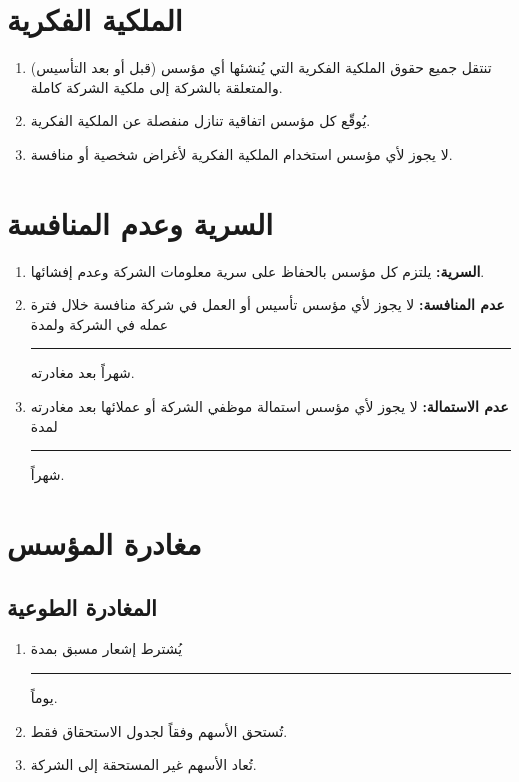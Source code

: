 \documentclass[12pt,a4paper]{article}
\begin{document}
\section{الملكية الفكرية}
\label{sec:ip}

\begin{enumerate}
    \item تنتقل جميع حقوق الملكية الفكرية التي يُنشئها أي مؤسس (قبل أو بعد التأسيس) والمتعلقة بالشركة إلى ملكية الشركة كاملة.
    \item يُوقّع كل مؤسس اتفاقية تنازل منفصلة عن الملكية الفكرية.
    \item لا يجوز لأي مؤسس استخدام الملكية الفكرية لأغراض شخصية أو منافسة.
\end{enumerate}

\section{السرية وعدم المنافسة}
\label{sec:confidentiality}

\begin{enumerate}
    \item \textbf{السرية:} يلتزم كل مؤسس بالحفاظ على سرية معلومات الشركة وعدم إفشائها.
    \item \textbf{عدم المنافسة:} لا يجوز لأي مؤسس تأسيس أو العمل في شركة منافسة خلال فترة عمله في الشركة ولمدة \rule{2cm}{0.4pt} شهراً بعد مغادرته.
    \item \textbf{عدم الاستمالة:} لا يجوز لأي مؤسس استمالة موظفي الشركة أو عملائها بعد مغادرته لمدة \rule{2cm}{0.4pt} شهراً.
\end{enumerate}

\section{مغادرة المؤسس}
\label{sec:departure}

\subsection{المغادرة الطوعية}
\begin{enumerate}
    \item يُشترط إشعار مسبق بمدة \rule{2cm}{0.4pt} يوماً.
    \item تُستحق الأسهم وفقاً لجدول الاستحقاق فقط.
    \item تُعاد الأسهم غير المستحقة إلى الشركة.
\end{enumerate}
\end{document}
